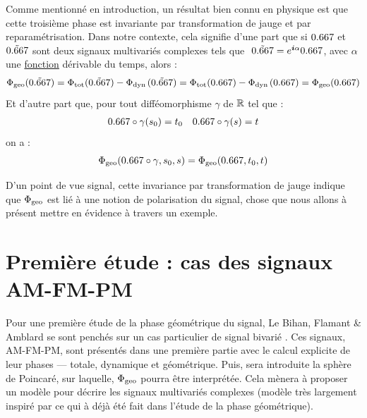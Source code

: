 Comme mentionné en introduction, un résultat bien connu en physique \cite{bohm_geometric_2003,mukunda_quantum_1993,chruscinski_geometric_2004} est que cette troisième phase est invariante par transformation de jauge et par reparamétrisation.
Dans notre contexte, cela signifie d'une part que si $\x$ et $\Tilde{\x}$ sont deux signaux multivariés complexes tels que $\ \Tilde{\x} = e^{\i \alpha}\x$, avec $\alpha$ une \underline{fonction} dérivable du temps, alors :
\begin{align*}
	\phaseg(\Tilde{\x}) &= \phaset(\Tilde{\x}) - \phased(\Tilde{\x})  = \phaset(\x) - \phased(\x) = \phaseg(\x)\\
\end{align*}
Et d'autre part que, pour tout difféomorphisme $\gamma$ de $\mathbb{R}$ tel que :
\begin{align*}
	\x\circ\gamma(s_0)&=t_0  &  \x \circ\gamma(s) = t
\end{align*}
on a :
\[\phaseg(\x \circ \gamma, s_0, s) = \phaseg(\x, t_0, t)\]
\skipl


D'un point de vue signal, cette invariance par transformation de jauge indique que $\Phi_{\text{\normalfont geo}}$ est lié à une notion de polarisation du signal, chose que nous allons à présent mettre en évidence à travers un exemple.
\\



\section{Première étude : cas des signaux AM-FM-PM} \label{sec:AM-FM-PM}

Pour une première étude de la phase géométrique du signal, Le Bihan, Flamant \& Amblard se sont penchés sur un cas particulier de signal bivarié \cite{flamant_timefrequency_2019,le_bihan_modephysiques_2023, le_bihan_geometric_2024}. Ces signaux, AM-FM-PM, sont présentés dans une première partie avec le calcul explicite de leur phases --- totale, dynamique et géométrique. Puis, sera introduite la sphère de Poincaré, sur laquelle, $\Phi_{\text{\normalfont geo}}$ pourra être interprétée.
Cela mènera à proposer un modèle pour décrire les signaux multivariés complexes (modèle très largement inspiré par ce qui à déjà été fait dans l'étude de la phase géométrique).
\\



